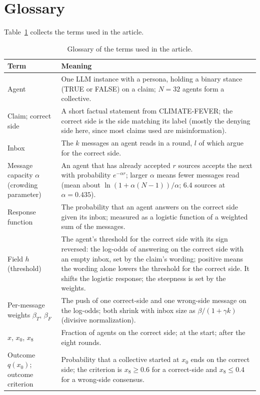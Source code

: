 \documentclass{ieeeaccess}
\begin{document}
\section{Glossary}\label{app:glossary}
Table~\ref{tab:terms} collects the terms used in the article.
\begin{table}[!t]
\caption{Glossary of the terms used in the article.}
\label{tab:terms}
\small
\begin{tabular}{@{}>{\raggedright\arraybackslash}p{}p{}@{}}
\toprule
Term & Meaning \\
\midrule
Agent & One LLM instance with a persona, holding a binary stance (TRUE or
FALSE) on a claim; $N = 32$ agents form a collective. \\
Claim; correct side & A short factual statement from CLIMATE-FEVER; the
correct side is the side matching its label (mostly the denying side here,
since most claims used are misinformation). \\
Inbox & The $k$ messages an agent reads in a round, $l$ of which argue for
the correct side. \\
Message capacity $\alpha$ (crowding parameter) & An agent that has already
accepted $r$ sources accepts the next with probability $e^{-\alpha r}$;
larger $\alpha$ means fewer messages read (mean about
$\ln(1+\alpha(N-1))/\alpha$; 6.4 sources at $\alpha = 0.435$). \\
Response function & The probability that an agent answers on the correct
side given its inbox; measured as a logistic function of a weighted sum of
the messages. \\
Field $h$ (threshold) & The agent's threshold for the correct side with
its sign reversed: the log-odds of answering on the correct side with an
empty inbox, set by the claim's wording; positive means the wording alone
lowers the threshold for the correct side. It shifts the logistic response;
the steepness is set by the weights. \\
Per-message weights $\beta_T$, $\beta_F$ & The push of one correct-side and
one wrong-side message on the log-odds; both shrink with inbox size as
$\beta/(1+\gamma k)$ (divisive normalization). \\
$x$, $x_0$, $x_8$ & Fraction of agents on the correct side; at the start;
after the eight rounds. \\
Outcome $q(x_0)$; outcome criterion & Probability that a collective
started at $x_0$ ends on the correct side; the criterion is $x_8 \ge 0.6$
for a correct-side and $x_8 \le 0.4$ for a wrong-side consensus. \\

\end{tabular}
\end{table}
\end{document}
